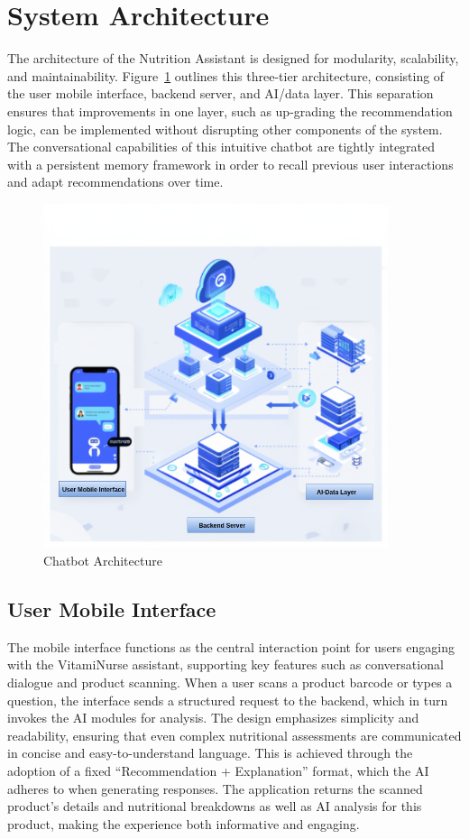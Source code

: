 \section{System Architecture}
The architecture of the Nutrition Assistant is designed for modularity, scalability, and maintainability. Figure~\ref{fig:chatbot_Architect_layers} outlines this three-tier architecture, consisting of the user mobile interface, backend server, and AI/data layer.
 This separation ensures that improvements in one layer, such as up-grading the recommendation logic, can be implemented without disrupting other components of the system. The conversational capabilities of this intuitive chatbot are tightly integrated with a persistent memory framework in order to recall previous user interactions and adapt recommendations over time.  
\begin{figure}[H]
\includegraphics[width=0.9\textwidth]{images/chat_layers.png}
\caption{Chatbot Architecture} 
\label{fig:chatbot_Architect_layers}
\end{figure}

\subsection{User Mobile Interface}
The mobile interface functions as the central interaction point for users
engaging with the VitamiNurse assistant, supporting key features such
as conversational dialogue and product scanning. When a user scans a
product barcode or types a question, the interface sends a structured
request to the backend, which in turn invokes the AI modules for analysis.
The design emphasizes simplicity and readability, ensuring that even
complex nutritional assessments are communicated in concise and easy-to-understand language. 
This is achieved through the adoption of a fixed
“Recommendation + Explanation” format, which the AI adheres to
when generating responses. The application returns the scanned product’s details and nutritional breakdowns as well as AI analysis for this product,
making the experience both informative and engaging.

